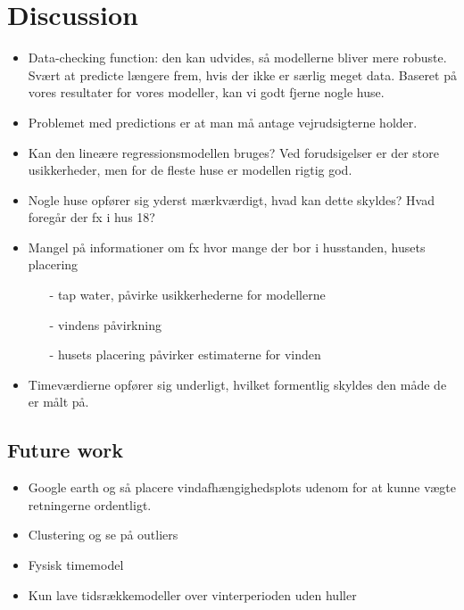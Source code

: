 \chapter{Discussion}
\label{chap: discussion}

\begin{itemize}
    \item Data-checking function: den kan udvides, så modellerne bliver mere robuste. Svært at predicte længere frem, hvis der ikke er særlig meget data. Baseret på vores resultater for vores modeller, kan vi godt fjerne nogle huse.
    \item Problemet med predictions er at man må antage vejrudsigterne holder.
    \item Kan den lineære regressionsmodellen bruges? Ved forudsigelser er der store usikkerheder, men for de fleste huse er modellen rigtig god. 
    \item Nogle huse opfører sig yderst mærkværdigt, hvad kan dette skyldes? Hvad foregår der fx i hus 18?
    \item Mangel på informationer om fx hvor mange der bor i husstanden, husets placering \begin{itemize}
        \item[-] tap water, påvirke usikkerhederne for modellerne
        \item[-] vindens påvirkning
        \item[-] husets placering påvirker estimaterne for vinden  
    \end{itemize}
    \item Timeværdierne opfører sig underligt, hvilket formentlig skyldes den måde de er målt på. 
\end{itemize}

\section{Future work}
\begin{itemize}
    \item Google earth og så placere vindafhængighedsplots udenom for at kunne vægte retningerne ordentligt. 
    \item Clustering og se på outliers
    \item Fysisk timemodel 
    \item Kun lave tidsrækkemodeller over vinterperioden uden huller
\end{itemize}